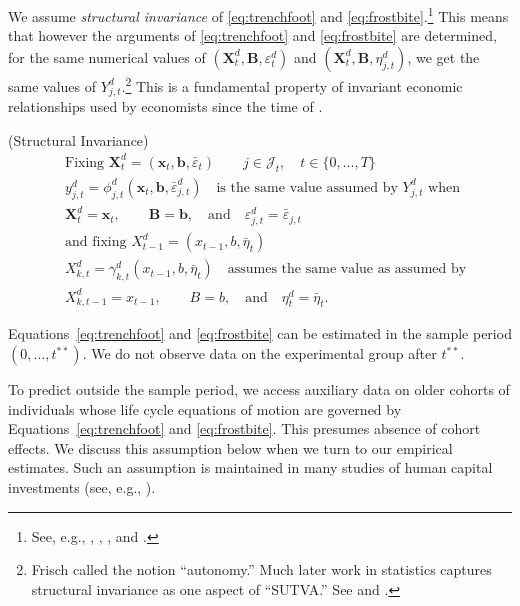 We assume \emph{structural invariance} of \eqref{eq:trenchfoot} and \eqref{eq:frostbite}.\footnote{See, e.g., \citet{Frisch_1938_autonomy}, \citet{Haavelmo_1943_Econometrica,Haavelmo_1944_Econometrica}, \citet{Hurwicz_1962_structural}, and \citet{Heckman_Pinto_2015_EconometTheory}.} This means that however the arguments of \eqref{eq:trenchfoot} and \eqref{eq:frostbite} are determined, for the same numerical values of $(\bm{X}^d_t, \bm{B}, \varepsilon^d_t)$ and $(\bm{X}^d_t, \bm{B}, \eta^d_{j,t})$, we get the same values of $Y^d_{j,t}$.\footnote{Frisch called the notion ``autonomy.'' Much later work in statistics captures structural invariance as one aspect of ``SUTVA.'' See \citet{Holland_1986_JASA} and \citet{Heckman_2008_ISR}.} This is a fundamental property of invariant economic relationships used by economists since the time of \citet{Frisch_1938_autonomy}.

\begin{assumption}\label{ass:butts}
(Structural Invariance)
\begin{align*}
&\text{Fixing } \bm{X}^d_t = (\bm{x}_t, \bm{b}, \bar{\varepsilon}_t) \qquad j \in \mathcal{J}_t, \quad t \in \{0,\ldots,T\}\\
&y^d_{j,t} = \phi^d_{j,t} (\bm{x}_t, \bm{b},  \bar{\varepsilon}^d_{j,t}) \quad \text{is the same value assumed by } Y^d_{j,t} \text{ when }\\
&\bm{X}^d_t = \bm{x}_t, \qquad \bm{B} = \bm{b}, \quad \text{and} \quad \varepsilon^d_{j,t} = \bar{\varepsilon}_{j,t}\\
&\text{and fixing } X^d_{t-1} = (x_{t-1}, b, \bar{\eta}_t) \\
&X^d_{k,t} = \gamma^d_{k,t} (x_{t-1}, b, \bar{\eta}_t) \quad \text{assumes the same value as assumed by}\\
&X^d_{k,t-1} = x_{t-1}, \qquad B = b, \quad \text{and} \quad \eta^d_t = \bar{\eta}_t.
\end{align*}
\end{assumption}

Equations~\eqref{eq:trenchfoot} and \eqref{eq:frostbite} can be estimated in the sample period $(0,\ldots,t^{**})$. We do not observe data on the experimental group after $t^{**}$. 

To predict outside the sample period, we access auxiliary data on older cohorts of individuals whose life cycle equations of motion are governed by Equations~\eqref{eq:trenchfoot} and \eqref{eq:frostbite}. This presumes absence of cohort effects. We discuss this assumption below when we turn to our empirical estimates. Such an assumption is maintained in many studies of human capital investments (see, e.g., \citealp{Heckman_Lochner_ea_2006_HEE}).

